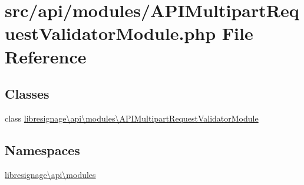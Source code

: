 \hypertarget{APIMultipartRequestValidatorModule_8php}{}\section{src/api/modules/\+A\+P\+I\+Multipart\+Request\+Validator\+Module.php File Reference}
\label{APIMultipartRequestValidatorModule_8php}
\subsection*{Classes}
\begin{DoxyCompactItemize}
\item 
class \hyperlink{classlibresignage_1_1api_1_1modules_1_1APIMultipartRequestValidatorModule}{libresignage\textbackslash{}api\textbackslash{}modules\textbackslash{}\+A\+P\+I\+Multipart\+Request\+Validator\+Module}
\end{DoxyCompactItemize}
\subsection*{Namespaces}
\begin{DoxyCompactItemize}
\item 
 \hyperlink{namespacelibresignage_1_1api_1_1modules}{libresignage\textbackslash{}api\textbackslash{}modules}
\end{DoxyCompactItemize}
